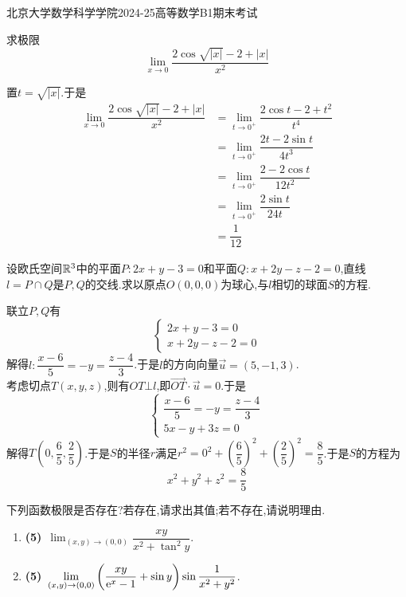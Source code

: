 \documentclass{ctexart}
\begin{document}
\pagestyle{empty}
\begin{center}\Large
    北京大学数学科学学院2024-25高等数学B1期末考试
\end{center}
\begin{problem}[1.(10\songti{分})]
    求极限\[\lim_{x\to0}\dfrac{2\cos\sqrt{|x|}-2+|x|}{x^2}\]
\end{problem}
\begin{solution}
    置$t=\sqrt{|x|}$.于是
    \[\begin{aligned}
        \lim_{x\to0}\dfrac{2\cos\sqrt{|x|}-2+|x|}{x^2}
        &= \lim_{t\to0^+}\dfrac{2\cos t-2+t^2}{t^4} \\
        &= \lim_{t\to0^+}\dfrac{2t-2\sin t}{4t^3} \\
        &= \lim_{t\to0^+}\dfrac{2-2\cos t}{12t^2} \\
        &= \lim_{t\to0^+}\dfrac{2\sin t}{24t} \\
        &= \dfrac{1}{12}
    \end{aligned}\]
\end{solution}
\begin{problem}[2.(10\songti{分})]
    设欧氏空间$\mathbb{R}^3$中的平面$P:2x+y-3=0$和平面$Q:x+2y-z-2=0$,直线$l=P\cap Q$是$P,Q$的交线.求以原点$O(0,0,0)$为球心,与$l$相切的球面$S$的方程.
\end{problem}
\begin{solution}
    联立$P,Q$有
    \[\left\{\begin{array}{l}
        2x+y-3=0\\x+2y-z-2=0
    \end{array}\right.\]
    解得$l:\dfrac{x-6}{5}=-y=\dfrac{z-4}{3}$.于是$l$的方向向量$\vec{u}=(5,-1,3)$.\\
    考虑切点$T(x,y,z)$,则有$OT\bot l$,即$\overrightarrow{OT}\cdot\vec{u}=0$.于是
    \[\left\{\begin{array}{l}
        \dfrac{x-6}{5}=-y=\dfrac{z-4}{3} \\
        5x-y+3z=0
    \end{array}\right.\]
    解得$T\left(0,\dfrac{6}{5},\dfrac{2}{5}\right)$.于是$S$的半径$r$满足$r^2=0^2+\left(\dfrac65\right)^2+\left(\dfrac25\right)^2=\dfrac85$.于是$S$的方程为
    \[x^2+y^2+z^2=\dfrac85\]
\end{solution}
\begin{problem}[3.(10\songti{分})]
    下列函数极限是否存在?若存在,请求出其值;若不存在,请说明理由.
    \begin{enumerate}[label=\tbf{(\arabic*)}]
        \item \textbf{(5)}\ \(\displaystyle\lim_{(x,y)\to(0,0)}\dfrac{xy}{x^2+\tan^2y}\).
        \item \textbf{(5)}\ \(\displaystyle\lim_{(x,y)\to(0,0)}\left(\dfrac{xy}{\mathrm{e}^x-1}+\sin y\right)\sin\dfrac{1}{x^2+y^2}\).
    \end{enumerate}
\end{problem}
\end{document}
